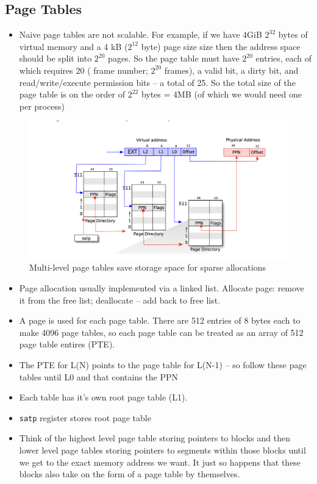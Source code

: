 \documentclass[../notes.tex]{subfiles}
\begin{document}
\subsection{Page Tables}

\begin{itemize}
    \item Naive page tables are not scalable. For example, if we have 4GiB $ 2^{32} $ bytes of virtual memory and a 4 kB ($ 2^{12} $ byte) page size size then the address space should be split into $ 2^{20} $ pages. So the page table must have $ 2^{20} $ entries, each of which requires $ 20 $ ( frame number; $ 2^{20} $ frames), a valid bit, a dirty bit, and read/write/execute permission bits -- a total of 25. So the total size of the page table is on the order of $ 2^{22} $ bytes = 4MB (of which we would need one per process)
\end{itemize}

\begin{figure}[H]
    \centering
    \includegraphics[width=0.8\linewidth]{img/image_2023-02-08-15-15-10.png}
    \caption{Multi-level page tables save storage space for sparse allocations}
\end{figure}

\begin{itemize}
    \item Page allocation usually implemented via a linked list. Allocate page: remove it from the free list; deallocate -- add back to free list.
    \item A page is used for each page table. There are 512 entries of 8 bytes each to make 4096 page tables, so each page table can be treated as an array of 512 page table entires (PTE).
    \item The PTE for L(N) points to the page table for L(N-1) -- so follow these page tables until L0 and that contains the PPN
    \item Each table has it's own root page table (L1).
    \item \texttt{satp} register stores root page table
    \item Think of the highest level page table storing pointers to blocks and then lower level page tables storing pointers to segments within those blocks until we get to the exact memory address we want. It just so happens that these blocks also take on the form of a page table by themselves. 
\end{itemize}
\end{document}
